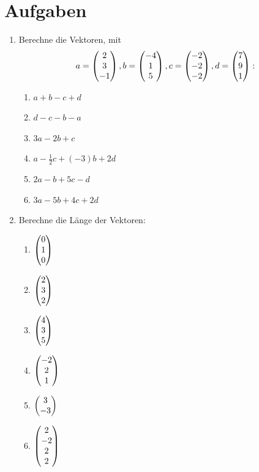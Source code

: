 		
	\section{Aufgaben}
		
		\begin{enumerate}
			\item Berechne die Vektoren, mit \[a = \mvect{2\\3\\-1}, b= \mvect{-4\\1\\5},
			c = \mvect{-2\\-2\\-2}, d = \mvect{7\\9\\1}:\]
				\begin{multicols}{2}
					\begin{enumerate}
					   \item $a+b-c+d$
					   \item $d-c-b-a$
					   \item $3a-2b+c$
					   \item $a-\frac{1}{2}c+(-3)b+2d$
					   \item $2a-b+5c-d$
					   \item $3a-5b+4c+2d$
			  		\end{enumerate}
				\end{multicols}
			\item Berechne die Länge der Vektoren:
			\begin{multicols}{3}
				\begin{enumerate}
				    \item $\left(\!\!\!\begin{array}{c}0\\1\\0 \end{array}\!\!\!\right)$
				    \item $\left(\!\!\!\begin{array}{c}2\\3\\2 \end{array}\!\!\!\right)$
				    \item $\left(\!\!\!\begin{array}{c}4\\3\\5 \end{array}\!\!\!\right)$
				    \item $\left(\!\!\!\begin{array}{c}-2\\2\\1 \end{array}\!\!\!\right)$
				    \item $\left(\!\!\!\begin{array}{c}3\\-3 \end{array}\!\!\!\right)$
				    \item $\left(\!\!\!\begin{array}{c}2\\-2\\2\\2 \end{array}\!\!\!\right)$

\end{enumerate}
\end{multicols}
\end{enumerate}
